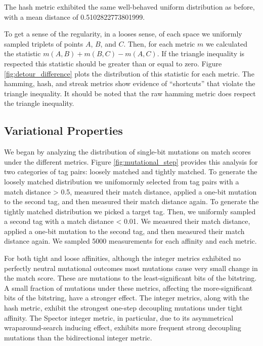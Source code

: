 The hash metric exhibited the same well-behaved uniform distribution as before, with a mean distance of 0.5102822773801999.



To get a sense of the regularity, in a looses sense, of each space we uniformly sampled triplets of points $A$, $B$, and $C$.
Then, for each metric $m$ we calculated the statistic $m(A, B) + m(B, C) - m(A, C)$.
If the triangle inequality is respected this statistic should be greater than or equal to zero.
Figure \ref{fig:detour_difference} plots the distribution of this statistic for each metric.
The hamming, hash, and streak metrics show evidence of ``shortcuts'' that violate the triangle inequality.
It should be noted that the raw hamming metric does respect the triangle inequality.



\subsection{Variational Properties}



We began by analyzing the distribution of single-bit mutations on match scores under the different metrics.
Figure \ref{fig:mutational_step} provides this analysis for two categories of tag pairs: loosely matched and tightly matched.
To generate the loosely matched distribution we unifomormly selected from tag pairs with a match distance > 0.5, measured their match distance, applied a one-bit mutation to the second tag, and then measured their match distance again.
To generate the tightly matched distribution we picked a target tag.
Then, we uniformly sampled a second tag with a match distance < 0.01.
We measured their match distance, applied a one-bit mutation to the second tag, and then measured their match distance again.
We sampled 5000 measurements for each affinity and each metric.

For both tight and loose affinities, although the integer metrics exhibited no perfectly neutral mutational outcomes most mutations cause very small change in the match score.
These are mutations to the least-significant bits of the bitstring.
A small fraction of mutations under these metrics, affecting the more-significant bits of the bitstring, have a stronger effect.
The integer metrics, along with the hash metric, exhibit the strongest one-step decoupling mutations under tight affinity.
The Spector integer metric, in particular, due to its asymmetrical wraparound-search inducing effect, exhibits more frequent strong decoupling mutations than the bidirectional integer metric.

